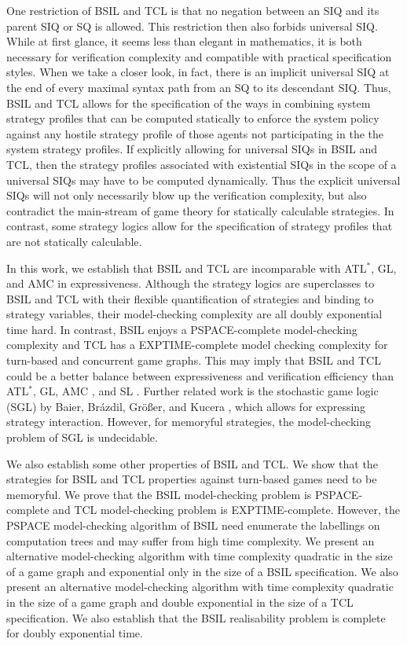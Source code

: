 One restriction of BSIL and TCL is that no negation between an SIQ and its parent SIQ or SQ is allowed. 
This restriction then also forbids universal SIQ.  
While at first glance, it seems less than elegant in mathematics, it is both necessary for verification complexity and compatible with practical specification styles.  
When we take a closer look, in fact, there is an implicit universal SIQ at the end of every maximal syntax path from an SQ to its descendant SIQ.
Thus, BSIL and TCL allows for the specification of the ways in combining system strategy profiles that can be computed statically to enforce the system policy against any hostile strategy profile of those agents not participating in the the system strategy profiles.  
If explicitly allowing for universal SIQs in BSIL and TCL, then the strategy profiles associated with existential SIQs in the scope of a universal SIQs may have to be computed dynamically.  
Thus the explicit universal SIQs will not only necessarily blow up the verification complexity, but also contradict the main-stream of game theory for statically calculable strategies.  
In contrast, some strategy logics \cite{MMV10} allow for the specification of strategy profiles that are not statically calculable. 

In this work, we establish that BSIL and TCL are incomparable with ATL$^*$, GL, and AMC in expressiveness.  
Although the strategy logics \cite{CHP10,CLM10,MMV10} are superclasses to BSIL and TCL with their flexible quantification of strategies and binding to strategy variables, their model-checking complexity are all doubly exponential time hard.  
In contrast, BSIL enjoys a PSPACE-complete model-checking complexity and TCL has a EXPTIME-complete model checking complexity for turn-based and concurrent game graphs.  
This may imply that BSIL and TCL could be a better balance between expressiveness and verification efficiency than ATL$^*$, GL, AMC \cite{AHK02}, and SL \cite{CHP10,MMV10}.
Further related work is the stochastic game logic (SGL) by Baier, Br\'azdil, Gr\"o{\ss}er, and Kucera \cite{BBGK07}, which allows for expressing strategy interaction.
However, for memoryful strategies, the model-checking problem of SGL is undecidable. 

We also establish some other properties of BSIL and TCL. 
We show that the strategies for BSIL and TCL properties against turn-based games need to be memoryful.
We prove that the BSIL model-checking problem is PSPACE-complete and TCL model-checking problem is EXPTIME-complete.  
However, the PSPACE model-checking algorithm of BSIL need enumerate the labellings on computation trees and may suffer from high time complexity.
We present an alternative model-checking algorithm with time complexity quadratic in the size of a game graph and exponential only in the size of a BSIL specification.
We also present an alternative model-checking algorithm with time complexity quadratic in the size of a game graph and  double exponential in the size of a TCL specification.
We also establish that the BSIL realisability problem is complete for doubly exponential time.

